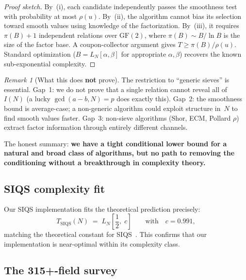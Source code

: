 \documentclass[12pt]{amsart}
\theoremstyle{definition}
\theoremstyle{remark}
\newtheorem{remark}[theorem]{Remark}
\begin{document}
\begin{proof}[Proof sketch]
By~(i), each candidate independently passes the smoothness test with
probability at most $\rho(u)$.  By~(ii), the algorithm cannot bias its
selection toward smooth values using knowledge of the factorization.  By~(iii),
it requires $\pi(B)+1$ independent relations over $\mathrm{GF}(2)$, where
$\pi(B)\sim B/\ln B$ is the size of the factor base.  A coupon-collector
argument gives $T\ge\pi(B)/\rho(u)$.  Standard optimization
($B=L_{N}[\alpha,\beta]$ for appropriate $\alpha,\beta$) recovers the known
sub-exponential complexity.
\end{proof}

\begin{remark}[What this does \textbf{not} prove]
The restriction to ``generic sieves'' is essential.  Gap~1: we do not prove that
a single relation cannot reveal all of $I(N)$ (a lucky $\gcd(a-b,N)=p$ does
exactly this).  Gap~2: the smoothness bound is average-case; a non-generic
algorithm could exploit structure in~$N$ to find smooth values faster.  Gap~3:
non-sieve algorithms (Shor, ECM, Pollard $\rho$) extract factor information
through entirely different channels.

The honest summary: \textbf{we have a tight conditional lower bound for a
natural and broad class of algorithms, but no path to removing the conditioning
without a breakthrough in complexity theory.}
\end{remark}

\subsection{SIQS complexity fit}

Our SIQS implementation fits the theoretical prediction precisely:
\[
  T_{\mathrm{SIQS}}(N) \;=\; L_{N}\!\left[\frac{1}{2},\;c\right]
  \qquad\text{with}\quad c=0.991,
\]
matching the theoretical constant for SIQS~\cite{Pomerance1996}.  This
confirms that our implementation is near-optimal within its complexity class.

\subsection{The 315+-field survey}
\end{document}
